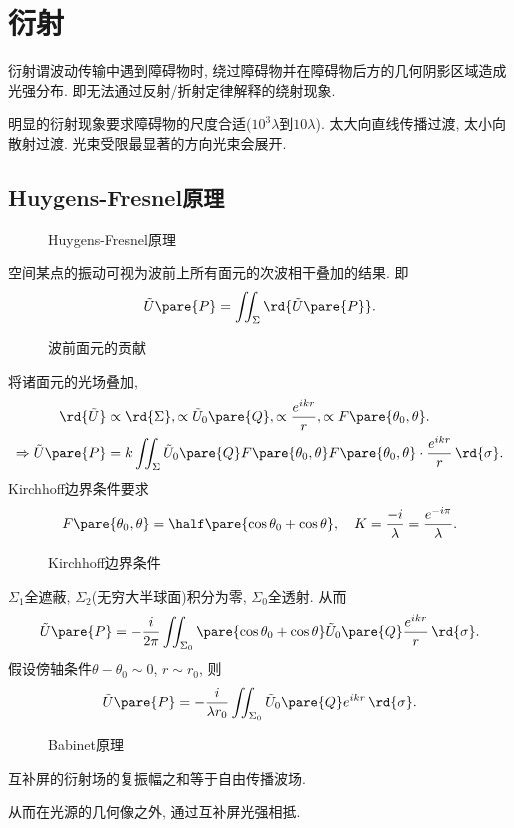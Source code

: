 \documentclass{ctexart}
\begin{document}
\section{衍射} %
\label{sec:衍射}

衍射谓波动传输中遇到障碍物时, 绕过障碍物并在障碍物后方的几何阴影区域造成光强分布. 即无法通过反射/折射定律解释的绕射现象.
\begin{figure}[ht]
    \centering
\end{figure}
明显的衍射现象要求障碍物的尺度合适($10^3\lambda$到$10\lambda$). 太大向直线传播过渡, 太小向散射过渡. 光束受限最显著的方向光束会展开.

\subsection{Huygens-Fresnel原理} %
\label{sub:huygens_fresnel原理}

\begin{figure}[ht]
    \centering
    \caption{Huygens-Fresnel原理}
\end{figure}
\begin{theorem}
    空间某点的振动可视为波前上所有面元的次波相干叠加的结果. 即
    \[ \tilde{U}\pare{P} = \iint_{\Sigma} \rd{\tilde{U}\pare{P}}. \]
\end{theorem}
\begin{figure}[ht]
    \centering
    \caption{波前面元的贡献}
\end{figure}
将诸面元的光场叠加,
\begin{align*}
    \rd{\tilde{U}} &\propto \rd{\Sigma}, \propto \tilde{U}_0\pare{Q}, \propto \frac{e^{ikr}}{r},\propto F\pare{\theta_0,\theta}. \\
    \Rightarrow \tilde{U}\pare{P} &= k\iint_{\Sigma} \tilde{U}_0\pare{Q} F\pare{\theta_0,\theta} F\pare{\theta_0,\theta} \cdot \frac{e^{ikr}}{r}\,\rd{\sigma}.
\end{align*}
Kirchhoff边界条件要求
\[ F\pare{\theta_0,\theta} = \half\pare{\cos\theta_0 + \cos\theta},\quad K = \frac{-i}{\lambda} = \frac{e^{-i\pi}}{\lambda}. \]
\begin{figure}[ht]
    \centering
    \caption{Kirchhoff边界条件}
\end{figure}
$\Sigma_1$全遮蔽, $\Sigma_2$(无穷大半球面)积分为零, $\Sigma_0$全透射. 从而
\[ \tilde{U}\pare{P} = -\frac{i}{2\pi} \iint_{\Sigma_0} \pare{\cos\theta_0 + \cos\theta} \tilde{U}_0\pare{Q} \frac{e^{ikr}}{r}\,\rd{\sigma}. \]
假设傍轴条件$\theta - \theta_0 \sim 0$, $r\sim r_0$, 则
\[ \tilde{U}\pare{P} = -\frac{i}{\lambda r_0} \iint_{\Sigma_0} \tilde{U}_0\pare{Q}e^{ikr}\,\rd{\sigma}. \]
\begin{figure}[ht]
    \centering
     \raisebox{1.4cm}{$+$}
     \raisebox{1.4cm}{$=$}
    \caption{Babinet原理}
\end{figure}
\begin{theorem}[Babinet原理]
    互补屏的衍射场的复振幅之和等于自由传播波场.
\end{theorem}
从而在光源的几何像之外, 通过互补屏光强相抵.
\end{document}
